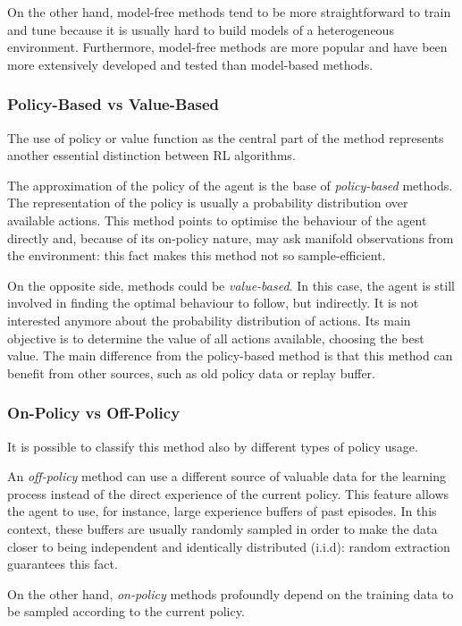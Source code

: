 On the other hand, model-free methods tend to be more straightforward to train and tune because it is usually hard to build models of a heterogeneous environment. Furthermore, model-free methods are more popular and have been more extensively developed and tested than model-based methods.

\subsubsection{Policy-Based vs Value-Based}

The use of policy or value function as the central part of the method represents another essential distinction between RL algorithms.

The approximation of the policy of the agent is the base of \textit{policy-based} methods. The representation of the policy is usually a probability distribution over available actions. This method points to optimise the behaviour of the agent directly and, because of its on-policy nature, may ask manifold observations from the environment: this fact makes this method not so sample-efficient.

On the opposite side, methods could be \textit{value-based}. In this case, the agent is still involved in finding the optimal behaviour to follow, but indirectly. It is not interested anymore about the probability distribution of actions. Its main objective is to determine the value of all actions available, choosing the best value. The main difference from the policy-based method is that this method can benefit from other sources, such as old policy data or replay buffer.

\subsubsection{On-Policy vs Off-Policy}

It is possible to classify this method also by different types of policy usage.

An \textit{off-policy} method can use a different source of valuable data for the learning process instead of the direct experience of the current policy. This feature allows the agent to use, for instance, large experience buffers of past episodes. In this context, these buffers are usually randomly sampled in order to make the data closer to being independent and identically distributed (i.i.d): random extraction guarantees this fact.

On the other hand, \textit{on-policy} methods profoundly depend on the training data to be sampled according to the current policy.


